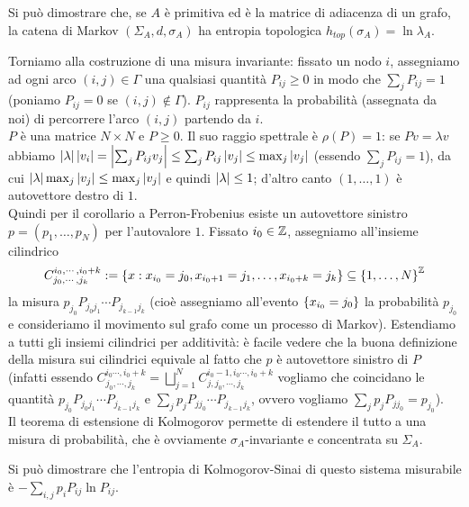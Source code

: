 \begin{oss}Si può dimostrare che, se $A$ è primitiva ed è la matrice di adiacenza di un grafo, la catena di Markov
$(\Sigma_A,d,\sigma_A)$ ha entropia topologica $h_{top}(\sigma_A)=\ln \lambda_A$.
\end{oss}

Torniamo alla costruzione di una misura invariante: fissato un nodo $i$, assegniamo ad ogni arco $(i,j)\in\Gamma$
una qualsiasi quantità $P_{ij}\ge 0$ in modo che $\sum_j P_{ij}=1$ (poniamo $P_{ij}=0$ se $(i,j)\nin\Gamma$).
$P_{ij}$ rappresenta la probabilità (assegnata da noi) di percorrere l'arco $(i,j)$ partendo da $i$. \\
$P$ è una matrice $N\times N$ e $P\ge 0$. Il suo raggio spettrale è $\rho(P)=1$:
se $Pv=\lambda v$ abbiamo $\left|\lambda\right|\left|v_i\right|=\left|\sum_j P_{ij}v_j\right|\le\sum_j P_{ij}\left|v_j\right|\le\max_j\left|v_j\right|$
(essendo $\sum_j P_{ij}=1$), da cui $\left|\lambda\right|\max_j\left|v_j\right|\le\max_j\left|v_j\right|$ e quindi $\left|\lambda\right|\le 1$;
d'altro canto $(1,\dots,1)$ è autovettore destro di $1$. \\
Quindi per il corollario a Perron-Frobenius esiste un autovettore sinistro
$p=(p_1,\dots,p_N)$ per l'autovalore $1$.
Fissato $i_0\in\mathbb{Z}$, assegniamo all'insieme cilindrico
\[ C^{i_0,\cdots, i_0+k}_{j_0,\cdots, j_k}:=\left\{x:x_{i_0}=j_0,x_{i_0+1}=j_1,\dots,x_{i_0+k}=j_k\right\}\subseteq\left\{1,\dots,N\right\}^{\mathbb{Z}} \]
la misura $p_{j_0}P_{j_0j_1}\cdots P_{j_{k-1}j_k}$
(cioè assegniamo all'evento $\left\{x_{i_0}=j_0\right\}$ la probabilità
$p_{j_0}$ e consideriamo il movimento sul grafo come un processo di Markov).
Estendiamo a tutti gli insiemi cilindrici per additività: è facile vedere che la buona definizione della misura sui cilindrici
equivale al fatto che $p$ è autovettore sinistro di $P$
(infatti essendo $C^{i_0\cdots, i_0+k}_{j_0,\cdots, j_k}=\bigsqcup_{j=1}^N C^{i_0-1,i_0\cdots, i_0+k}_{j,j_0,\cdots, j_k}$
vogliamo che coincidano le quantità  $p_{j_0}P_{j_0 j_1}\cdots P_{j_{k-1}j_k}$ e $\sum_j p_jP_{jj_0}\cdots P_{j_{k-1}j_k}$,
ovvero vogliamo $\sum_j p_j P_{jj_0}=p_{j_0}$). \\
Il teorema di estensione di Kolmogorov permette di estendere il tutto a una misura di probabilità, che è ovviamente $\sigma_A$-invariante
e concentrata su $\Sigma_A$.

Si può dimostrare che l'entropia di Kolmogorov-Sinai di questo sistema misurabile è $-\sum_{i,j}p_iP_{ij}\ln P_{ij}$.


